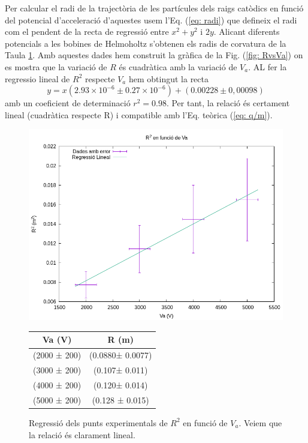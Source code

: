 \documentclass[11pt]{article}
\begin{document}
Per calcular el radi de la trajectòria de les partícules dels raigs catòdics en funció del potencial d'acceleració d'aquestes usem l'Eq. (\ref{eq: radi}) que defineix el radi com el pendent de la recta de regressió entre $x^2+y^2$ i $2y$. Alicant diferents potencials a les bobines de Helmoholtz s'obtenen els radis de corvatura de la Taula \ref{tab:RvsVa}. Amb aquestes dades hem construit la gràfica de la Fig. (\ref{fig: RvsVa}) on es mostra que la variació de $R$ és cuadràtica amb la variació de $V_a$. AL fer la regressio lineal de $R^2$ respecte $V_a$ hem obtingut la recta
\begin{equation}
    y=x(2.93\times10^{-6}\pm0.27\times10^{-6})+(0.00228\pm0,00098)
\end{equation}  
amb un coeficient de determinació $r^2=0.98$. Per tant, la relació és certament lineal (cuadràtica respecte R) i compatible amb l'Eq. teòrica (\ref{eq: q/m}).

\begin{figure}[h]
    \centering
    \begin{minipage}{0.45\textwidth}
        \centering
        \includegraphics[width=\textwidth]{RvsVa.png}
        \caption{Regressió dels punts experimentals de $R^2$ en funció de $V_a$. Veiem que la relació és clarament lineal.}
        \label{fig: RvsVa}
    \end{minipage}
    \hfill
    \begin{minipage}{0.45\textwidth} 
        \centering
        \begin{tabular}{|c|c|}
            \hline
            Va (V)	&	R (m)	\\\hline
            (2000 ± 200)	&	(0.0880± 0.0077)	\\\hline
            (3000 ± 200)	&	(0.107± 0.011)	\\\hline
            (4000 ± 200)	&	(0.120± 0.014)	\\\hline
            (5000 ± 200)	&	(0.128 ± 0.015)	\\\hline
            
        \end{tabular}
        \label{tab:RvsVa}
    \end{minipage}
\end{figure}
\end{document}
